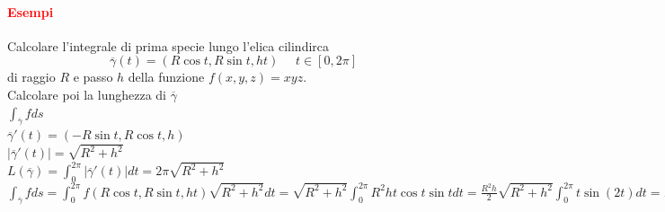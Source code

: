 \documentclass{article}
\begin{document}
\paragraph{\textcolor{red}{Esempi}}
Calcolare l'integrale di prima specie lungo l'elica cilindirca 
\begin{equation*}
    \overline{\gamma}(t)=(R \cos t , R \sin t , h t)\,\,\,\,\,\,\,\,t \in [0,2\pi]
\end{equation*}
di raggio $R$ e passo $h$ della funzione $f(x,y,z)=xyz$.\\
Calcolare poi la lunghezza di $\overline{\gamma}$\\
$\int_{\overline{\gamma}} f ds$\\
$\overline{\gamma}'(t)=(-R\sin t , R \cos t , h)$\\
$|\overline{\gamma}'(t)|=\sqrt{R^2+h^2}$\\
$L(\overline{\gamma})=\int_0^{2\pi}|\overline{\gamma}'(t)|dt=2\pi \sqrt{R^2+h^2}$\\
$\int_{\overline{\gamma}} f ds = \int_0^{2\pi} f(R \cos t , R \sin t , h t)\sqrt{R^2 +h^2} dt= \sqrt{R^2 + h^2} \int_0^{2\pi} R^2h t \cos t \sin t dt = \frac{ R^2 h}{2}\sqrt{R^2+h^2}\int_0^{2\pi}t \sin (2t)dt=...
$
\end{document}
